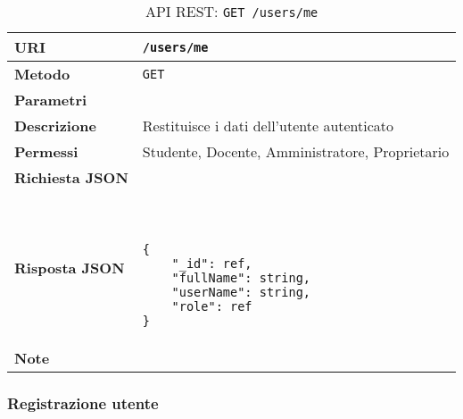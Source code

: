         \begin{table}[H]
            \begin{center}
                \begin{tabular}{p{} p{}}
                    \toprule
                    \textbf{URI} & \texttt{/users/me} \\ \midrule
                    \textbf{Metodo} & \texttt{GET} \\ \midrule
                    \textbf{Parametri} & \\ \midrule
                    \textbf{Descrizione} & Restituisce i dati dell'utente autenticato \\ \midrule
                    \textbf{Permessi} & Studente, Docente, Amministratore, Proprietario  \\ \midrule
                    \textbf{Richiesta JSON} & \\ \midrule
                    \textbf{Risposta JSON} & \
                        \begin{lstlisting}[basicstyle={\ttfamily}]
{
    "_id": ref,
    "fullName": string,
    "userName": string,
    "role": ref
}
                        \end{lstlisting}
                        \\ \midrule
                    \textbf{Note} & \\
                    \bottomrule
                \end{tabular}
                \caption{API REST: \texttt{GET /users/me}}
            \end{center}
        \end{table}

    \subsubsection{Registrazione utente}

